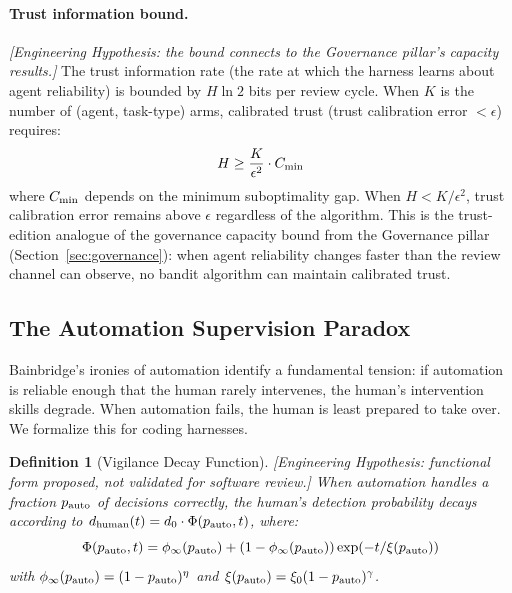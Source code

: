 \documentclass[11pt, a4paper]{googledeepmind}
\newtheorem{definition}{Definition}[section]
\begin{document}
\paragraph{Trust information bound.} \emph{[Engineering Hypothesis: the bound connects to the Governance pillar's capacity results.]} The trust information rate (the rate at which the harness learns about agent reliability) is bounded by $H \ln 2$ bits per review cycle. When $K$ is the number of (agent, task-type) arms, calibrated trust (trust calibration error $< \epsilon$) requires:
\begin{equation}
H \geq \frac{K}{\epsilon^2} \cdot C_{\textup{min}}
\end{equation}
where $C_{\textup{min}}$ depends on the minimum suboptimality gap. When $H < K/\epsilon^2$, trust calibration error remains above $\epsilon$ regardless of the algorithm. This is the trust-edition analogue of the governance capacity bound from the Governance pillar (Section~\ref{sec:governance}): when agent reliability changes faster than the review channel can observe, no bandit algorithm can maintain calibrated trust.

\subsection{The Automation Supervision Paradox}

Bainbridge's \citeyearpar{bainbridge1983ironies} ironies of automation identify a fundamental tension: if automation is reliable enough that the human rarely intervenes, the human's intervention skills degrade. When automation fails, the human is least prepared to take over. We formalize this for coding harnesses.

\begin{definition}[Vigilance Decay Function]
\emph{[Engineering Hypothesis: functional form proposed, not validated for software review.]}
\label{def:vigilance}
When automation handles a fraction $p_{\textup{auto}}$ of decisions correctly, the human's detection probability decays according to $d_{\textup{human}}(t) = d_0 \cdot \Phi(p_{\textup{auto}}, t)$, where:
\begin{equation}
\Phi(p_{\textup{auto}}, t) = \phi_\infty(p_{\textup{auto}}) + (1 - \phi_\infty(p_{\textup{auto}})) \exp\!\left(-t / \xi(p_{\textup{auto}})\right)
\end{equation}
with $\phi_\infty(p_{\textup{auto}}) = (1 - p_{\textup{auto}})^\eta$ and $\xi(p_{\textup{auto}}) = \xi_0 (1 - p_{\textup{auto}})^\gamma$.
\end{definition}
\end{document}
